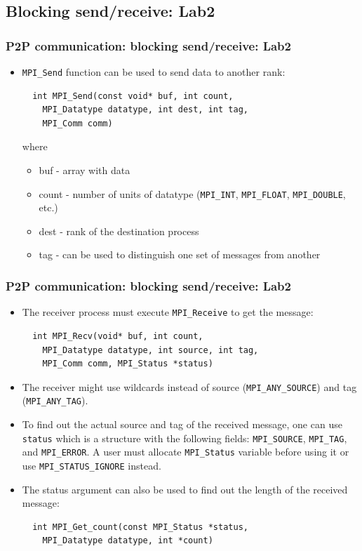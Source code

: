 \documentclass{beamer}
\begin{document}
\subsection{Blocking send/receive: Lab2}
\begin{frame}[fragile]
  \frametitle{P2P communication: blocking send/receive: Lab2}

\begin{itemize}
\item {\color{mycolorcode}\verb|MPI_Send|} function can be used to send data to another rank:
{\color{mycolorcode}
\begin{verbatim}
  int MPI_Send(const void* buf, int count, 
    MPI_Datatype datatype, int dest, int tag, 
    MPI_Comm comm)
\end{verbatim}
}
where
\begin{itemize}
\item {\color{mycolorcode}buf} - array with data
\item {\color{mycolorcode}count} - number of units of datatype ({\color{mycolorcode}\verb|MPI_INT|}, {\color{mycolorcode}\verb|MPI_FLOAT|}, {\color{mycolorcode}\verb|MPI_DOUBLE|}, etc.)
\item {\color{mycolorcode}dest} - rank of the destination process
\item {\color{mycolorcode}tag} - can be used to distinguish one set of messages from another
\end{itemize}
\end{itemize}
\end{frame}

\begin{frame}[fragile]
  \frametitle{P2P communication: blocking send/receive: Lab2}
\begin{itemize}
\item The receiver process must execute {\color{mycolorcode}\verb|MPI_Receive|} to get the message:
{\color{mycolorcode}
\begin{verbatim}
  int MPI_Recv(void* buf, int count, 
    MPI_Datatype datatype, int source, int tag, 
    MPI_Comm comm, MPI_Status *status)
\end{verbatim}
}
\item The receiver might use wildcards instead of source ({\color{mycolorcode}\verb|MPI_ANY_SOURCE|}) and tag ({\color{mycolorcode}\verb|MPI_ANY_TAG|}).
\item To find out the actual source and tag of the received message, one can use {\color{mycolorcode}\verb|status|} which is a structure with the following fields: {\color{mycolorcode}\verb|MPI_SOURCE|}, {\color{mycolorcode}\verb|MPI_TAG|},
and {\color{mycolorcode}\verb|MPI_ERROR|}. A user must allocate {\color{mycolorcode}\verb|MPI_Status|} variable before using it or use {\color{mycolorcode}\verb|MPI_STATUS_IGNORE|} instead.
\item The status argument can also be used to find out the length of the received message:
{\color{mycolorcode}
\begin{verbatim}
  int MPI_Get_count(const MPI_Status *status, 
    MPI_Datatype datatype, int *count)
\end{verbatim}
}
\end{itemize}
\end{frame}
\end{document}
